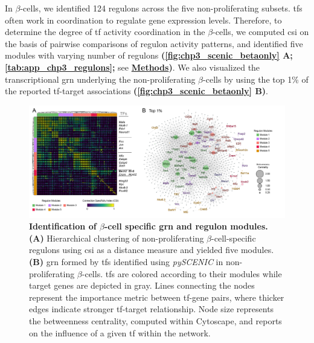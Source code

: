 \par In $\beta$-cells, we identified 124 regulons across the five non-proliferating subsets. \glspl{tf} often work in coordination to regulate gene expression levels. Therefore, to determine the degree of \gls{tf} activity coordination in the $\beta$-cells, we computed \gls{csi} on the basis of pairwise comparisons of regulon activity patterns, and identified five modules with varying number of regulons \textbf{(\autoref{fig:chp3_scenic_betaonly} A; \autoref{tab:app_chp3_regulons};} see \hyperref[subsubsec:met_chp3_scenic]{\textbf{Methods}}\textbf{)}. We also visualized the transcriptional \gls{grn} underlying the non-proliferating $\beta$-cells by using the top 1\% of the reported \gls{tf}-target associations \textbf{(\autoref{fig:chp3_scenic_betaonly} B)}.

\begin{figure}[H]
\centering
\includegraphics[width=\linewidth]{Chapter5/Fig/F3-10-02.png}
\caption[Identification of $\beta$-cell specific  and regulon modules]{\textbf{Identification of $\beta$-cell specific \gls{grn} and regulon modules.} \textbf{(A)} Hierarchical clustering of non-proliferating $\beta$-cell-specific regulons using \gls{csi} as a distance measure and yielded five modules. \textbf{(B)} \gls{grn} formed by \glspl{tf} identified using \textit{pySCENIC} in non-proliferating $\beta$-cells. \glspl{tf} are colored according to their modules while target genes are depicted in gray. Lines connecting the nodes represent the importance metric between \gls{tf}-gene pairs, where thicker edges indicate stronger \gls{tf}-target relationship. Node size represents the betweenness centrality, computed within Cytoscape, and reports on the influence of a given \gls{tf} within the network.}
\label{fig:chp3_scenic_betaonly}
\end{figure}


